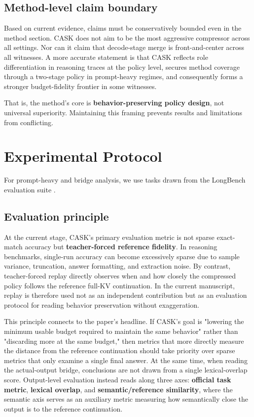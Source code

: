\subsection{Method-level claim boundary}


Based on current evidence, claims must be conservatively bounded even in the method section. CASK does not aim to be the most aggressive compressor across all settings. Nor can it claim that decode-stage merge is front-and-center across all witnesses. A more accurate statement is that CASK reflects role differentiation in reasoning traces at the policy level, secures method coverage through a two-stage policy in prompt-heavy regimes, and consequently forms a stronger budget-fidelity frontier in some witnesses.


That is, the method's core is \textbf{behavior-preserving policy design}, not universal superiority. Maintaining this framing prevents results and limitations from conflicting.


\section{Experimental Protocol}

For prompt-heavy and bridge analysis, we use tasks drawn from the LongBench evaluation suite \citep{bai2024longbench}.


\subsection{Evaluation principle}


At the current stage, CASK's primary evaluation metric is not sparse exact-match accuracy but \textbf{teacher-forced reference fidelity}. In reasoning benchmarks, single-run accuracy can become excessively sparse due to sample variance, truncation, answer formatting, and extraction noise. By contrast, teacher-forced replay directly observes when and how closely the compressed policy follows the reference full-KV continuation. In the current manuscript, replay is therefore used not as an independent contribution but as an evaluation protocol for reading behavior preservation without exaggeration.


This principle connects to the paper's headline. If CASK's goal is "lowering the minimum usable budget required to maintain the same behavior" rather than "discarding more at the same budget," then metrics that more directly measure the distance from the reference continuation should take priority over sparse metrics that only examine a single final answer. At the same time, when reading the actual-output bridge, conclusions are not drawn from a single lexical-overlap score. Output-level evaluation instead reads along three axes: \textbf{official task metric}, \textbf{lexical overlap}, and \textbf{semantic/reference similarity}, where the semantic axis serves as an auxiliary metric measuring how semantically close the output is to the reference continuation.


